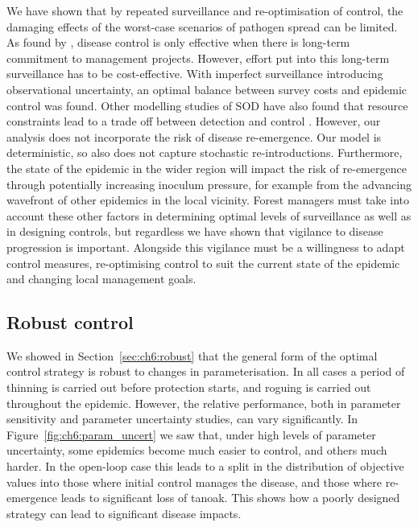 We have shown that by repeated surveillance and re-optimisation of control, the damaging effects of the worst-case scenarios of pathogen spread can be limited. As found by \citet{cobb_resiliency_2017}, disease control is only effective when there is long-term commitment to management projects. However, effort put into this long-term surveillance has to be cost-effective. With imperfect surveillance introducing observational uncertainty, an optimal balance between survey costs and epidemic control was found. Other modelling studies of SOD have also found that resource constraints lead to a trade off between detection and control \citep{ndeffo_mbah_balancing_2010, cunniffe_modelling_2016}. However, our analysis does not incorporate the risk of disease re-emergence. Our model is deterministic, so also does not capture stochastic re-introductions. Furthermore, the state of the epidemic in the wider region will impact the risk of re-emergence through potentially increasing inoculum pressure, for example from the advancing wavefront of other epidemics in the local vicinity. Forest managers must take into account these other factors in determining optimal levels of surveillance as well as in designing controls, but regardless we have shown that vigilance to disease progression is important. Alongside this vigilance must be a willingness to adapt control measures, re-optimising control to suit the current state of the epidemic and changing local management goals.

\subsection{Robust control}

We showed in Section~\ref{sec:ch6:robust} that the general form of the optimal control strategy is robust to changes in parameterisation. In all cases a period of thinning is carried out before protection starts, and roguing is carried out throughout the epidemic. However, the relative performance, both in parameter sensitivity and parameter uncertainty studies, can vary significantly. In Figure~\ref{fig:ch6:param_uncert} we saw that, under high levels of parameter uncertainty, some epidemics become much easier to control, and others much harder. In the open-loop case this leads to a split in the distribution of objective values into those where initial control manages the disease, and those where re-emergence leads to significant loss of tanoak. This shows how a poorly designed strategy can lead to significant disease impacts.

